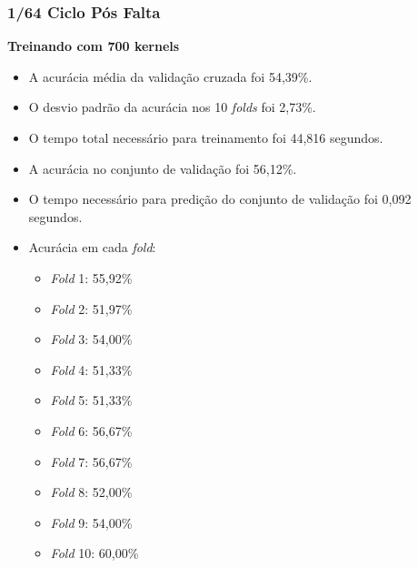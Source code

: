 \subsubsection{1/64 Ciclo Pós Falta}
\textbf{Treinando com 700 kernels}
\begin{itemize}
    \item A acurácia média da validação cruzada foi 54,39\%.
    \item O desvio padrão da acurácia nos 10 \textit{folds} foi 2,73\%.
    \item O tempo total necessário para treinamento foi 44,816 segundos.
    \item A acurácia no conjunto de validação foi 56,12\%.
    \item O tempo necessário para predição do conjunto de validação foi 0,092 segundos.
    \item Acurácia em cada \textit{fold}:
    \begin{itemize}
        \item \textit{Fold} 1: 55,92\%
        \item \textit{Fold} 2: 51,97\%
        \item \textit{Fold} 3: 54,00\%
        \item \textit{Fold} 4: 51,33\%
        \item \textit{Fold} 5: 51,33\%
        \item \textit{Fold} 6: 56,67\%
        \item \textit{Fold} 7: 56,67\%
        \item \textit{Fold} 8: 52,00\%
        \item \textit{Fold} 9: 54,00\%
        \item \textit{Fold} 10: 60,00\%
    \end{itemize}
\end{itemize}

